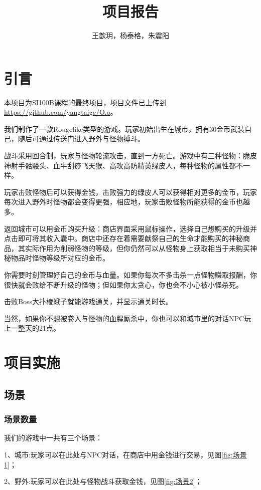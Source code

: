 \documentclass{ctexart}
\title{项目报告}
\author{王歆玥，杨泰格，朱震阳}
\begin{document}
\maketitle

\section{引言}

本项目为SI100B课程的最终项目，项目文件已上传到\href{https://github.com/yangtaige/O.o}{https://github.com/yangtaige/O.o}。

我们制作了一款Rougelike类型的游戏。玩家初始出生在城市，拥有30金币武装自己，随后可通过传送门进入野外与怪物搏斗。

战斗采用回合制，玩家与怪物轮流攻击，直到一方死亡。游戏中有三种怪物：脆皮神射手骷髅头、血牛刮痧飞天猴、高攻高防精英绿皮人，每种怪物的属性都不一样。
    
玩家击败怪物后可以获得金钱，击败强力的绿皮人可以获得相对更多的金币，玩家每次进入野外时怪物都会变得更强，相应地，玩家击败怪物所能获得的金币也越多。
    
返回城市可以用金币购买升级：商店界面采用鼠标操作，选择自己想购买的升级并点击即可将其收入囊中。商店中还存在着需要献祭自己的生命才能购买的神秘商品，其实际作用为削弱怪物的等级，但你仍然可以从怪物身上获取相当于未购买神秘物品时怪物等级所对应的金币。

你需要时刻管理好自己的金币与血量。如果你每次不多击杀一点怪物赚取报酬，你很快就会败给不断升级的怪物；但如果你太贪心，你也会不小心被小怪杀死。
    
击败Boss大扑棱蛾子就能游戏通关，并显示通关时长。

当然，如果你不想被卷入与怪物的血腥厮杀中，你也可以和城市里的对话NPC玩上一整天的21点。

\section{项目实施}

\subsection{场景}
\subsubsection{场景数量}
我们的游戏中一共有三个场景：

1、城市:玩家可以在此处与NPC对话，在商店中用金钱进行交易，见图\ref{fig:场景1}；

2、野外:玩家可以在此处与怪物战斗获取金钱，见图\ref{fig:场景2}；
\end{document}
